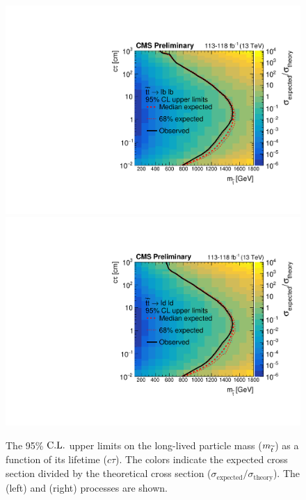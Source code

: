 \begin{figure}[hbtp]
\centering
\includegraphics[scale=0.39]{figures/results/2DlimitsCombinedStopToLB.pdf}
\includegraphics[scale=0.39]{figures/results/2DlimitsCombinedStopToLD.pdf}
\caption{The 95\% $\text{C.L.}$ upper limits on the long-lived particle mass ($m_{\widetilde{t}}$) as a function of its lifetime ($c\tau$). The colors indicate the expected cross section divided by the theoretical cross section ($\sigma_\text{expected}/\sigma_\text{theory}$). The \stoptolb (left) and \stoptold (right) processes are shown.} 
\label{limits_combined}
\end{figure}
